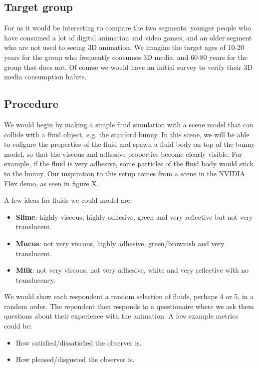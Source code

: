\documentclass{article}
\begin{document}
\begin{multicols}{2}
        \subsection{Target group}
        
            For us it would be interesting to compare the two segments: younger people who have consumed a lot of digital animation and video games, and an older segment who are not used to seeing 3D animation. We imagine the target ages of 10-20 years for the group who frequently consumes 3D media, and 60-80 years for the group that does not. Of course we would have an initial survey to verify their 3D media consumption habits.
            
        \subsection{Procedure}

            We would begin by making a simple fluid simulation with a scene model that can collide with a fluid object, e.g. the stanford bunny. In this scene, we will be able to cofigure the properties of the fluid and spawn a fluid body on top of the bunny model, so that the viscous and adhesive properties become clearly visible. For example, if the fluid is very adhesive, some particles of the fluid body would stick to the bunny. Our inspiration to this setup comes from a scene in the NVIDIA Flex demo, as seen in figure X.

            A few ideas for fluids we could model are:
            \begin{itemize}
                \item \textbf{Slime}: highly viscous, highly adhesive, green and very reflective but not very translucent.
                \item \textbf{Mucus}: not very viscous, highly adhesive, green/brownish and very translucent.
                \item \textbf{Milk}: not very viscous, not very adhesive, white and very reflective with no translucency.
            \end{itemize}

            We would show each respondent a random selection of fluids, perhaps 4 or 5, in a random order. The repondent then responds to a questionaire where we ask them questions about their experience with the animation. A few example metrics could be:
            \begin{itemize}
                \item How satisfied/dissatisfied the observer is.
                \item How pleased/disgusted the observer is.
            \end{itemize}
            

\end{multicols}
\end{document}
